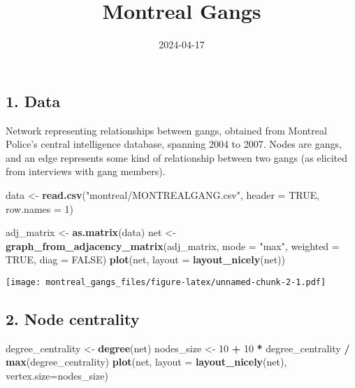 \documentclass[
]{article}
\title{Montreal Gangs}
\author{}
\date{\vspace{-2.5em}2024-04-17}
\newenvironment{Shaded}{\begin{snugshade}}{\end{snugshade}}
\newcommand{\AttributeTok}[1]{\textcolor[rgb]{0.13,0.29,0.53}{#1}}
\newcommand{\ConstantTok}[1]{\textcolor[rgb]{0.56,0.35,0.01}{#1}}
\newcommand{\DecValTok}[1]{\textcolor[rgb]{0.00,0.00,0.81}{#1}}
\newcommand{\FunctionTok}[1]{\textcolor[rgb]{0.13,0.29,0.53}{\textbf{#1}}}
\newcommand{\NormalTok}[1]{#1}
\newcommand{\OtherTok}[1]{\textcolor[rgb]{0.56,0.35,0.01}{#1}}
\newcommand{\SpecialCharTok}[1]{\textcolor[rgb]{0.81,0.36,0.00}{\textbf{#1}}}
\newcommand{\StringTok}[1]{\textcolor[rgb]{0.31,0.60,0.02}{#1}}
\begin{document}
\maketitle

\hypertarget{data}{%
\subsection{1. Data}\label{data}}

Network representing relationships between gangs, obtained from Montreal
Police's central intelligence database, spanning 2004 to 2007. Nodes are
gangs, and an edge represents some kind of relationship between two
gangs (as elicited from interviews with gang members).

\begin{Shaded}
\begin{Highlighting}[]
\NormalTok{data }\OtherTok{\textless{}{-}} \FunctionTok{read.csv}\NormalTok{(}\StringTok{"montreal/MONTREALGANG.csv"}\NormalTok{, }\AttributeTok{header =} \ConstantTok{TRUE}\NormalTok{, }\AttributeTok{row.names =} \DecValTok{1}\NormalTok{)}

\NormalTok{adj\_matrix }\OtherTok{\textless{}{-}} \FunctionTok{as.matrix}\NormalTok{(data)}
\NormalTok{net }\OtherTok{\textless{}{-}} \FunctionTok{graph\_from\_adjacency\_matrix}\NormalTok{(adj\_matrix, }\AttributeTok{mode =} \StringTok{"max"}\NormalTok{, }\AttributeTok{weighted =} \ConstantTok{TRUE}\NormalTok{, }\AttributeTok{diag =} \ConstantTok{FALSE}\NormalTok{)}
\FunctionTok{plot}\NormalTok{(net, }\AttributeTok{layout =} \FunctionTok{layout\_nicely}\NormalTok{(net))}
\end{Highlighting}
\end{Shaded}

\texttt{[image: montreal\_gangs\_files/figure-latex/unnamed-chunk-2-1.pdf]}

\hypertarget{node-centrality}{%
\subsection{2. Node centrality}\label{node-centrality}}

\begin{Shaded}
\begin{Highlighting}[]
\NormalTok{degree\_centrality }\OtherTok{\textless{}{-}} \FunctionTok{degree}\NormalTok{(net)}
\NormalTok{nodes\_size }\OtherTok{\textless{}{-}} \DecValTok{10} \SpecialCharTok{+} \DecValTok{10} \SpecialCharTok{*}\NormalTok{ degree\_centrality }\SpecialCharTok{/} \FunctionTok{max}\NormalTok{(degree\_centrality)}
\FunctionTok{plot}\NormalTok{(net, }\AttributeTok{layout =} \FunctionTok{layout\_nicely}\NormalTok{(net), }\AttributeTok{vertex.size=}\NormalTok{nodes\_size)}
\end{Highlighting}
\end{Shaded}
\end{document}

